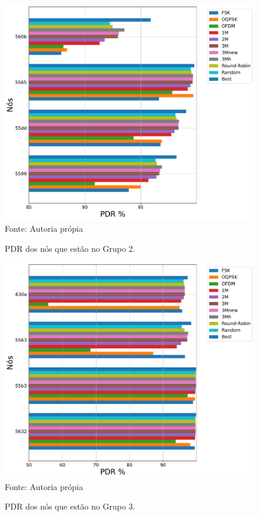 \begin{figure}[H]
    \centering
    \caption{\footnotesize PDR dos nós que estão no Grupo 2.}
    \includegraphics[scale = 0.6]{sections/textual/Imagens/grupo2.pdf}\\
    Fonte: Autoria própia
    \label{fig:g2}
\end{figure}

\begin{figure}[H]
    \centering
    \caption{\footnotesize PDR dos nós que estão no Grupo 3.}
    \includegraphics[scale =0.6]{sections/textual/Imagens/grupo3.pdf}\\
    Fonte: Autoria própia
    \label{fig:g3}
\end{figure}


